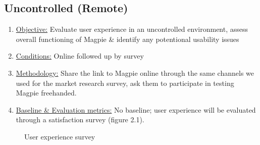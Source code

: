 \documentclass{report}
\begin{document}
\subsection{Uncontrolled (Remote)}
\begin{enumerate}
    \item \underline{Objective:} Evaluate user experience in an uncontrolled
          environment, assess overall functioning of Magpie \& identify any
          potentional usability issues
    \item \underline{Conditions:} Online followed up by survey
    \item \underline{Methodology:} Share the link to Magpie online through the same channels we used for the market research survey, ask them to participate in testing Magpie freehanded.
    \item \underline{Baseline \& Evaluation metrics:} No baseline; user experience will be evaluated through a satisfaction survey (figure 2.1).
\end{enumerate}
\begin{figure}
    \begin{minipage}{\textwidth}
        \centering
        \caption{User experience survey}
        \label{fig:plot9}
    \end{minipage}
\end{figure}
\end{document}
